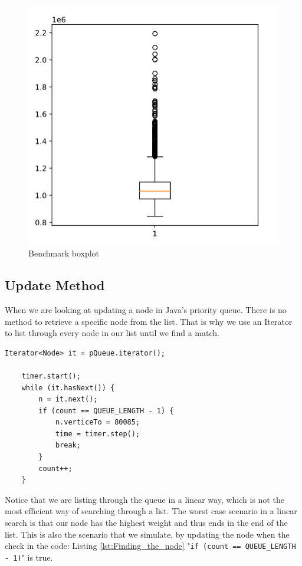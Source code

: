\documentclass{article}
\begin{document}
\begin{figure}[hbt!]
\label{img:boxplotorg}
\includegraphics[width=\textwidth]{boxplotorg}
\caption{Benchmark boxplot}
\end{figure}


\subsection{Update Method} %
When we are looking at updating a node in Java's priority queue. There is no method to retrieve a specific node from the list.
That is why we use an Iterator to list through every node in our list until we find a match.

\begin{lstlisting}[caption={Finding the node},label={lst:Finding_the_node}]
    Iterator<Node> it = pQueue.iterator();

    timer.start();
    while (it.hasNext()) {
        n = it.next();
        if (count == QUEUE_LENGTH - 1) {
            n.verticeTo = 80085;
            time = timer.step();
            break;
        }
        count++;
    }
\end{lstlisting}

Notice that we are listing through the queue in a linear way, which is not the most efficient way of searching through a list. 
The worst case scenario in a linear search is that our node has the highest weight and thus ends in the end of the list. 
This is also the scenario that we simulate, by updating the node when the check in the code: Listing \ref{lst:Finding_the_node} "\lstinline{if (count == QUEUE_LENGTH - 1)}" is true.
\end{document}
